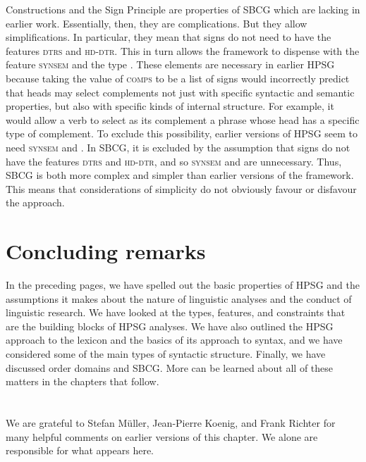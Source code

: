 \documentclass[output=paper,biblatex,babelshorthands,newtxmath,draftmode,colorlinks,citecolor=brown]{langscibook}
\begin{document}
\noindent
Constructions and the Sign Principle are properties of SBCG which are lacking in earlier
work. Essentially, then, they are complications. But they allow simplifications. In particular, they
mean that signs do not need to have the features \textsc{dtrs} and \textsc{hd-dtr}. This in turn
allows the framework to dispense with the feature \textsc{synsem} and the type . These
elements are necessary in earlier HPSG because taking the value of \textsc{comps} to be a list of
signs would incorrectly predict that heads may select complements not just with specific syntactic
and semantic properties, but also with specific kinds of internal structure. For example, it would
allow a verb to select as its complement a phrase whose head has a specific type of complement. To
exclude this possibility, earlier versions of HPSG seem to need \textsc{synsem} and 
\citep[]{ps2}. In SBCG, it is excluded by the assumption that signs do not have the features
\textsc{dtrs} and \textsc{hd-dtr}, and so \textsc{synsem} and  are unnecessary. Thus,
SBCG is both more complex and simpler than earlier versions of the framework. This means that
considerations of simplicity do not obviously favour or disfavour the approach. 

\section{Concluding remarks}\label{sec:prop8}

In the preceding pages, we have spelled out the basic properties of HPSG and the assumptions it makes about the nature of linguistic analyses and the conduct of linguistic research. We have looked at the types, features, and constraints that are the building blocks of HPSG analyses. We have also outlined the HPSG approach to the lexicon and the basics of its approach to syntax, and we have considered some of the main types of syntactic structure. Finally, we have discussed order domains and SBCG. More can be learned about all of these matters in the chapters that follow.


\section*{\acknowledgmentsEN}

We are grateful to Stefan Müller, Jean-Pierre Koenig, and Frank Richter for many helpful comments on
earlier versions of this chapter. We alone are responsible for what appears here.



{\sloppy
\printbibliography[heading=subbibliography,notkeyword=this]
}
\end{document}
